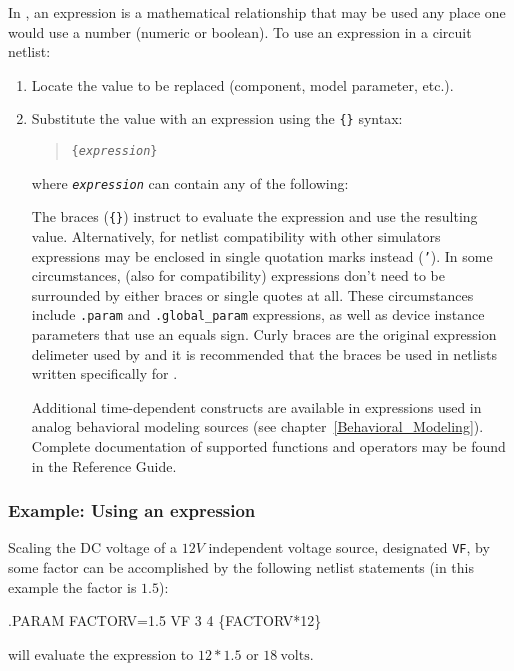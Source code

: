 In \Xyce{}, an expression is a mathematical relationship that may be
used any place one would use a number (numeric or boolean).  
To use an expression in a circuit netlist:
\begin{enumerate}
\item Locate the value to be replaced (component, model parameter, etc.).
\item Substitute the value with an expression using the \texttt{\{\}}
  syntax:
\begin{quote}
  \texttt{\{{\it expression\/}\}}%
\end{quote}
where \texttt{\it expression\/} can contain any of the
following:
The braces (\texttt{\{\}}) instruct \Xyce{} to evaluate the expression and use
the resulting value.   Alternatively,  for netlist compatibility with other simulators
expressions may be enclosed in single quotation marks instead (\texttt{'}).  In some circumstances, (also for compatibility)
expressions don't need to be surrounded by either braces or single quotes at all.   These circumstances
include \texttt{.param} and \texttt{.global\_param} expressions, as well as device instance 
parameters that use an equals sign.   Curly braces are the original expression delimeter used by \Xyce{} 
and it is recommended that the braces be used in
netlists written specifically for \Xyce{}.

Additional time-dependent constructs are available in expressions used in analog behavioral modeling sources (see chapter~\ref{Behavioral_Modeling}).    Complete documentation of supported functions and operators may be found in the \Xyce{} Reference Guide\ReferenceGuide{}.


\end{enumerate}

\subsubsection{Example:  Using an expression}
Scaling the DC voltage of a $12V$ independent voltage source, designated
\verb+VF+, by some factor can be accomplished by the following netlist
statements (in this example the factor is $1.5$):
\begin{vquote}
.PARAM FACTORV=1.5
VF 3 4 \{FACTORV*12\}
\end{vquote}
\Xyce{} will evaluate the expression to $12 * 1.5$ or $18\:\mbox{volts}$.

